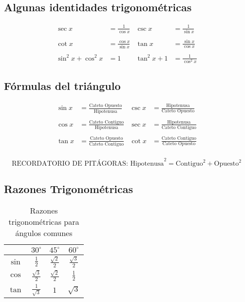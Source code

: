 \documentclass{article}
\begin{document}
\subsection{Algunas identidades trigonométricas}

\begin{align*}
    \sec x &= \frac{1}{\cos x} & \csc x &= \frac{1}{\sin x} \\
    \quad \\
    \cot x &= \frac{\cos x}{\sin x} & \tan x &= \frac{\sin x}{\cos x} \\
    \quad \\
    \sin^2 x + \cos^2 x &= 1 & \tan^2 x + 1 &= \frac{1}{\cos^2  x}
\end{align*}

\subsection{Fórmulas del triángulo}

\begin{align*}
    \sin x &= \frac{\text{Cateto Opuesto}}{\text{Hipotenusa}} & \csc{x } &= \frac{\text{Hipotenusa}}{\text{Cateto Opuesto}} \\
    \quad \\
    \cos x &= \frac{\text{Cateto Contiguo}}{\text{Hipotenusa}} & \sec x &= \frac{\text{Hipotenusa}}{\text{Cateto Contiguo}} \\
    \quad \\
    \tan x &= \frac{\text{Cateto Opuesto}}{\text{Cateto Contiguo}} & \cot x &= \frac{\text{Cateto Contiguo}}{\text{Cateto Opuesto}} \\
\end{align*}


\noindent $$\text{RECORDATORIO DE PITÁGORAS: Hipotenusa}^2 = \text{Contiguo} ^2 + \text{Opuesto}^2$$



\subsection{Razones Trigonométricas}
\begin{table}[h]
    \centering
    \large
    \renewcommand{\arraystretch}{2} %
    \begin{tabular}{|c|c|c|c|}
        \hline
        & $30^\circ$ & $45^\circ$ & $60^\circ$ \\
        \hline
        $\sin$ & $\frac{1}{2}$ & $\frac{\sqrt{2}}{2}$ & $\frac{\sqrt{3}}{2}$ \\
        \hline
        $\cos$ & $\frac{\sqrt{3}}{2}$ & $\frac{\sqrt{2}}{2}$ & $\frac{1}{2}$ \\
        \hline
        $\tan$ & $\frac{1}{\sqrt{3}}$ & $1$ & $\sqrt{3}$ \\
        \hline
    \end{tabular}
    \caption{Razones trigonométricas para ángulos comunes}
    \label{tab:trig_ratios}
\end{table}
\end{document}
